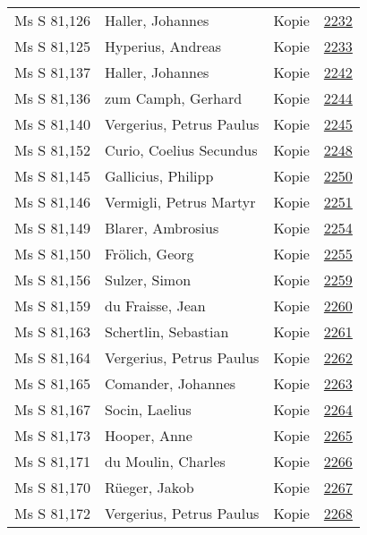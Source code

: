 \documentclass[10pt,a4paper,landscape]{report}
\begin{document}
\begin{longtable}{p{16cm}p{4cm}lr}
Ms S 81,126	&	Haller, Johannes	&	Kopie	&	\href{http://130.60.24.72/assignment/2232}{2232}\\
Ms S 81,125	&	Hyperius, Andreas	&	Kopie	&	\href{http://130.60.24.72/assignment/2233}{2233}\\
Ms S 81,137	&	Haller, Johannes	&	Kopie	&	\href{http://130.60.24.72/assignment/2242}{2242}\\
Ms S 81,136	&	zum Camph, Gerhard	&	Kopie	&	\href{http://130.60.24.72/assignment/2244}{2244}\\
Ms S 81,140	&	Vergerius, Petrus Paulus	&	Kopie	&	\href{http://130.60.24.72/assignment/2245}{2245}\\
Ms S 81,152	&	Curio, Coelius Secundus	&	Kopie	&	\href{http://130.60.24.72/assignment/2248}{2248}\\
Ms S 81,145	&	Gallicius, Philipp	&	Kopie	&	\href{http://130.60.24.72/assignment/2250}{2250}\\
Ms S 81,146	&	Vermigli, Petrus Martyr	&	Kopie	&	\href{http://130.60.24.72/assignment/2251}{2251}\\
Ms S 81,149	&	Blarer, Ambrosius	&	Kopie	&	\href{http://130.60.24.72/assignment/2254}{2254}\\
Ms S 81,150	&	Frölich, Georg	&	Kopie	&	\href{http://130.60.24.72/assignment/2255}{2255}\\
Ms S 81,156	&	Sulzer, Simon	&	Kopie	&	\href{http://130.60.24.72/assignment/2259}{2259}\\
Ms S 81,159	&	du Fraisse, Jean	&	Kopie	&	\href{http://130.60.24.72/assignment/2260}{2260}\\
Ms S 81,163	&	Schertlin, Sebastian	&	Kopie	&	\href{http://130.60.24.72/assignment/2261}{2261}\\
Ms S 81,164	&	Vergerius, Petrus Paulus	&	Kopie	&	\href{http://130.60.24.72/assignment/2262}{2262}\\
Ms S 81,165	&	Comander, Johannes	&	Kopie	&	\href{http://130.60.24.72/assignment/2263}{2263}\\
Ms S 81,167	&	Socin, Laelius	&	Kopie	&	\href{http://130.60.24.72/assignment/2264}{2264}\\
Ms S 81,173	&	Hooper, Anne	&	Kopie	&	\href{http://130.60.24.72/assignment/2265}{2265}\\
Ms S 81,171	&	du Moulin, Charles	&	Kopie	&	\href{http://130.60.24.72/assignment/2266}{2266}\\
Ms S 81,170	&	Rüeger, Jakob	&	Kopie	&	\href{http://130.60.24.72/assignment/2267}{2267}\\
Ms S 81,172	&	Vergerius, Petrus Paulus	&	Kopie	&	\href{http://130.60.24.72/assignment/2268}{2268}\\

\end{longtable}
\end{document}
